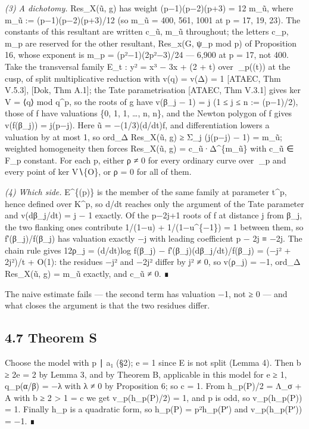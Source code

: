 \documentclass[11pt,a4paper]{article}
\theoremstyle{named}
\begin{document}
\textit{(3) A dichotomy.} Res\_X(ũ, g) has weight (p−1)(p−2)(p+3) = 12 m\_ũ, where m\_ũ := (p−1)(p−2)(p+3)/12 (so m\_ũ = 400, 561, 1001 at p = 17, 19, 23). The constants of this resultant are written c\_ũ, m\_ũ throughout; the letters c\_p, m\_p are reserved for the other resultant, Res\_x(G, ψ\_p mod p) of Proposition 16, whose exponent is m\_p = (p²−1)(2p²−3)/24 — 6,900 at p = 17, not 400. Take the transversal family E\_t : y² = x³ − 3x + (2 + t) over \_p((t)) at the cusp, of split multiplicative reduction with v(q) = v(Δ) = 1 [ATAEC, Thm V.5.3], [Dok, Thm A.1]; the Tate parametrisation [ATAEC, Thm V.3.1] gives ker V = ⟨q⟩ mod q\textasciicircum{}p, so the roots of g have v(β\_j − 1) = j (1 ≤ j ≤ n := (p−1)/2), those of f have valuations \{0, 1, 1, …, n, n\}, and the Newton polygon of f gives v(f(β\_j)) = j(p−j). Here ũ = −(1/3)(d/dt)f, and differentiation lowers a valuation by at most 1, so ord\_Δ Res\_X(ũ, g) ≥ Σ\_j (j(p−j) − 1) = m\_ũ; weighted homogeneity then forces Res\_X(ũ, g) = c\_ũ·Δ\textasciicircum{}\{m\_ũ\} with c\_ũ ∈ F\_p constant. For each p, either ρ ≠ 0 for every ordinary curve over \_p and every point of ker V∖\{O\}, or ρ = 0 for all of them.

\textit{(4) Which side.} E\textasciicircum{}\{(p)\} is the member of the same family at parameter t\textasciicircum{}p, hence defined over K\textasciicircum{}p, so d/dt reaches only the argument of the Tate parameter and v(dβ\_j/dt) = j − 1 exactly. Of the p−2j+1 roots of f at distance j from β\_j, the two flanking ones contribute 1/(1−u) + 1/(1−u\textasciicircum{}\{−1\}) = 1 between them, so f′(β\_j)/f(β\_j) has valuation exactly −j with leading coefficient p − 2j ≡ −2j. The chain rule gives 12ρ\_j = (d/dt)log f(β\_j) − f′(β\_j)(dβ\_j/dt)/f(β\_j) = (−j² + 2j²)/t + O(1): the residues −j² and −2j² differ by j² ≠ 0, so v(ρ\_j) = −1, ord\_Δ Res\_X(ũ, g) = m\_ũ exactly, and c\_ũ ≠ 0. ∎

The naive estimate fails — the second term has valuation −1, not ≥ 0 — and what closes the argument is that the two residues differ.

\subsection*{4.7 Theorem S}

Choose the model with p ∣ a₁ (§2); e = 1 since E is not split (Lemma 4). Then b ≥ 2e = 2 by Lemma 3, and by Theorem B, applicable in this model for e ≥ 1, q\_p(α/β) = −λ with λ ≠ 0 by Proposition 6; so c = 1. From h\_p(P)/2 = Λ\_σ + A with b ≥ 2 \textgreater{} 1 = c we get v\_p(h\_p(P)/2) = 1, and p is odd, so v\_p(h\_p(P)) = 1. Finally h\_p is a quadratic form, so h\_p(P) = p²h\_p(P′) and v\_p(h\_p(P′)) = −1. ∎
\end{document}
